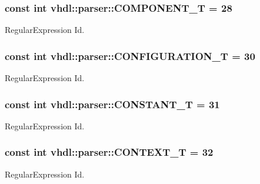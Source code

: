\subsubsection[{C\+O\+M\+P\+O\+N\+E\+N\+T\+\_\+\+T}]{\setlength{\rightskip}{0pt plus 5cm}const int vhdl\+::parser\+::\+C\+O\+M\+P\+O\+N\+E\+N\+T\+\_\+\+T = 28}\label{namespacevhdl_1_1parser_ac00ecd8f252f371ac88205ac5da3df13}
Regular\+Expression Id. \hypertarget{namespacevhdl_1_1parser_a2b9edd4e296f1d02091875c8bc7ef78a}{}
\subsubsection[{C\+O\+N\+F\+I\+G\+U\+R\+A\+T\+I\+O\+N\+\_\+\+T}]{\setlength{\rightskip}{0pt plus 5cm}const int vhdl\+::parser\+::\+C\+O\+N\+F\+I\+G\+U\+R\+A\+T\+I\+O\+N\+\_\+\+T = 30}\label{namespacevhdl_1_1parser_a2b9edd4e296f1d02091875c8bc7ef78a}
Regular\+Expression Id. \hypertarget{namespacevhdl_1_1parser_ac8a5fedb67fcb444de95956d9222180a}{}
\subsubsection[{C\+O\+N\+S\+T\+A\+N\+T\+\_\+\+T}]{\setlength{\rightskip}{0pt plus 5cm}const int vhdl\+::parser\+::\+C\+O\+N\+S\+T\+A\+N\+T\+\_\+\+T = 31}\label{namespacevhdl_1_1parser_ac8a5fedb67fcb444de95956d9222180a}
Regular\+Expression Id. \hypertarget{namespacevhdl_1_1parser_a3531a170e81d5d1ef17671b94c42a1e0}{}
\subsubsection[{C\+O\+N\+T\+E\+X\+T\+\_\+\+T}]{\setlength{\rightskip}{0pt plus 5cm}const int vhdl\+::parser\+::\+C\+O\+N\+T\+E\+X\+T\+\_\+\+T = 32}\label{namespacevhdl_1_1parser_a3531a170e81d5d1ef17671b94c42a1e0}
Regular\+Expression Id. \hypertarget{namespacevhdl_1_1parser_a6e37d38efdb4b8fd964ee4621288da69}{}
